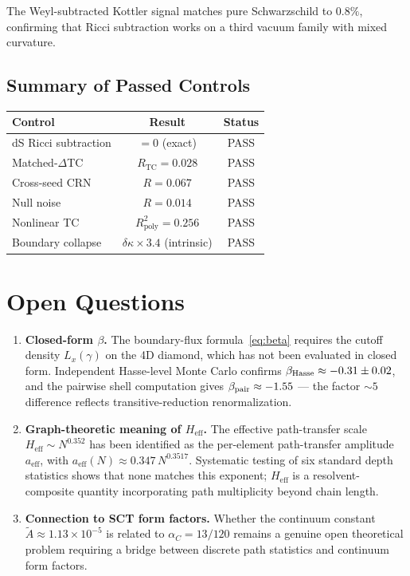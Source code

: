 \documentclass[12pt,a4paper]{article}
\begin{document}
\noindent The Weyl-subtracted Kottler signal matches pure Schwarzschild to $0.8\%$, confirming that Ricci subtraction works on a third vacuum family with mixed curvature.

\subsection{Summary of Passed Controls}

\begin{center}
\begin{tabular}{lcc}
\toprule
Control & Result & Status \\
\midrule
dS Ricci subtraction & $= 0$ (exact) & PASS \\
Matched-$\Delta$TC & $R_{\mathrm{TC}} = 0.028$ & PASS \\
Cross-seed CRN & $R = 0.067$ & PASS \\
Null noise & $R = 0.014$ & PASS \\
Nonlinear TC & $R^2_{\mathrm{poly}} = 0.256$ & PASS \\
Boundary collapse & $\delta\kappa \times 3.4$ (intrinsic) & PASS \\
\bottomrule
\end{tabular}
\end{center}

\section{Open Questions}

\begin{enumerate}
\item \textbf{Closed-form $\beta$.} The boundary-flux formula~\eqref{eq:beta} requires the cutoff density $L_x(\gamma)$ on the 4D diamond, which has not been evaluated in closed form. Independent Hasse-level Monte Carlo confirms $\beta_{\rm Hasse} \approx -0.31 \pm 0.02$, and the pairwise shell computation gives $\beta_{\rm pair} \approx -1.55$ --- the factor $\sim 5$ difference reflects transitive-reduction renormalization.

\item \textbf{Graph-theoretic meaning of $H_{\mathrm{eff}}$.} The effective path-transfer scale $H_{\mathrm{eff}} \sim N^{0.352}$ has been identified as the per-element path-transfer amplitude $a_{\mathrm{eff}}$, with $a_{\mathrm{eff}}(N) \approx 0.347\,N^{0.3517}$. Systematic testing of six standard depth statistics shows that none matches this exponent; $H_{\mathrm{eff}}$ is a resolvent-composite quantity incorporating path multiplicity beyond chain length.

\item \textbf{Connection to SCT form factors.} Whether the continuum constant $\tilde{A} \approx 1.13 \times 10^{-5}$ is related to $\alpha_C = 13/120$ remains a genuine open theoretical problem requiring a bridge between discrete path statistics and continuum form factors.
\end{enumerate}
\end{document}
